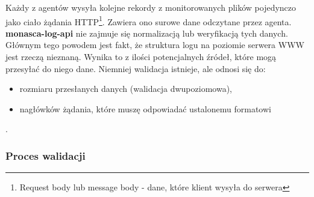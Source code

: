     Każdy z agentów wysyła kolejne rekordy z monitorowanych plików pojedynczo jako
    ciało żądania HTTP\footnote{Request body lub message body - dane, które klient wysyła do serwera}.
    Zawiera ono surowe dane odczytane przez agenta. \textbf{monasca-log-api} nie zajmuje się normalizacją lub weryfikacją tych danych. Głównym tego powodem jest fakt, że struktura logu na poziomie
    serwera WWW jest rzeczą nieznaną. Wynika to z ilości potencjalnych źródeł, które 
    mogą przesyłać do niego dane. Niemniej walidacja istnieje, ale odnosi się do:
    \begin{itemize}
        \item rozmiaru przesłanych danych (walidacja dwupoziomowa),
        \item nagłówków żądania, które muszę odpowiadać ustalonemu formatowi
    \end{itemize}\cite{monasca_log_api_spec}.
    
    \subsubsection{Proces walidacji}
    \label{chapter:monasca:monasca_log_api:validation}
    
